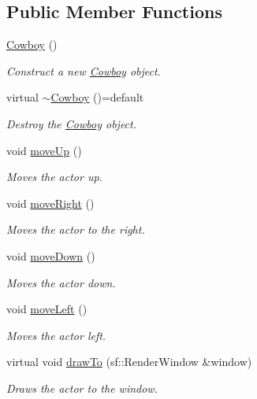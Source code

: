 \subsection*{Public Member Functions}
\begin{DoxyCompactItemize}
\item 
\mbox{\hyperlink{classCowboy_ae2972a731f41aea03b97b7814f1ec6d0}{Cowboy}} ()
\begin{DoxyCompactList}\small\item\em Construct a new \mbox{\hyperlink{classCowboy}{Cowboy}} object. \end{DoxyCompactList}\item 
virtual \mbox{\hyperlink{classCowboy_a2a82f675073318efefd3a0f6c297fe08}{$\sim$\+Cowboy}} ()=default
\begin{DoxyCompactList}\small\item\em Destroy the \mbox{\hyperlink{classCowboy}{Cowboy}} object. \end{DoxyCompactList}\item 
void \mbox{\hyperlink{classCowboy_a3c4b0540c47492d02fa64b4740a35bcf}{move\+Up}} ()
\begin{DoxyCompactList}\small\item\em Moves the actor up. \end{DoxyCompactList}\item 
void \mbox{\hyperlink{classCowboy_a2094d31b2535a25ef8a40945473cf884}{move\+Right}} ()
\begin{DoxyCompactList}\small\item\em Moves the actor to the right. \end{DoxyCompactList}\item 
void \mbox{\hyperlink{classCowboy_a25b9c66203a4a5e762984ca0bed511e0}{move\+Down}} ()
\begin{DoxyCompactList}\small\item\em Moves the actor down. \end{DoxyCompactList}\item 
void \mbox{\hyperlink{classCowboy_a487cf6b5d1e37586e6e9b408d2aaad1a}{move\+Left}} ()
\begin{DoxyCompactList}\small\item\em Moves the actor left. \end{DoxyCompactList}\item 
virtual void \mbox{\hyperlink{classCowboy_af7e8a3e9cdcd9054b63a3661ca3f69a6}{draw\+To}} (sf\+::\+Render\+Window \&window)
\begin{DoxyCompactList}\small\item\em Draws the actor to the window. \end{DoxyCompactList}\end{DoxyCompactItemize}
